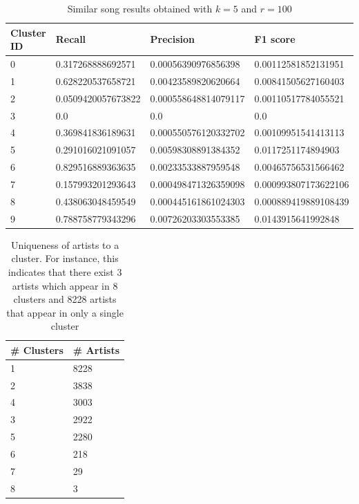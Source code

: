 \documentclass[10pt,a4paper, twocolumn]{article}
\begin{document}
\begin{table}[h]
\centering
\caption{Similar song results obtained with $k = 5$ and $r = 100$}
\begin{tabular}{@{}llll@{}}
\toprule
Cluster ID & Recall             & Precision            & F1 score             \\ \midrule
0          & 0.317268888692571  & 0.00056390976856398  & 0.00112581852131951  \\
1          & 0.628220537658721  & 0.00423589820620664  & 0.00841505627160403  \\
2          & 0.0509420057673822 & 0.000558648814079117 & 0.00110517784055521  \\
3          & 0.0                   & 0.0                     &  0.0                    \\
4          & 0.369841836189631  & 0.000550576120332702 & 0.00109951541413113  \\
5          & 0.291016021091057  & 0.00598308891384352  & 0.0117251174894903   \\
6          & 0.829516889363635  & 0.00233533887959548  & 0.00465756531566462  \\
7          & 0.157993201293643  & 0.000498471326359098 & 0.000993807173622106 \\
8          & 0.438063048459549  & 0.000445161861024303 & 0.000889419889108439 \\
9          & 0.788758779343296  & 0.00726203303553385  & 0.0143915641992848   \\ \bottomrule
\end{tabular}
\label{tab:res}
\end{table}

\begin{table}[!t]
\caption{Uniqueness of artists to a cluster. For instance, this indicates that there exist 3 artists which appear in 8 clusters and 8228 artists that appear in only a single cluster}
\centering
\begin{tabular}{@{}ll@{}}
\toprule
\# Clusters & \# Artists \\ \midrule
1             & 8228         \\
2             & 3838         \\
4             & 3003         \\
3             & 2922         \\
5             & 2280         \\
6             & 218          \\
7             & 29           \\
8             & 3            \\ \bottomrule
\end{tabular}
\label{tab:num_artists_clusters}
\end{table}
  
\end{document}
